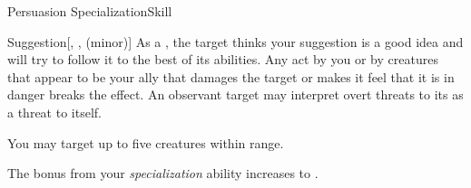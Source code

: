 \begin{feat}{Persuasion Specialization}{Skill}
\begin{freeability}{Suggestion}[, ,  (minor)]
            \hit As a , the target thinks your suggestion is a good idea and will try to follow it to the best of its abilities.
            Any act by you or by creatures that appear to be your ally that damages the target or makes it feel that it is in danger breaks the effect.
            An observant target may interpret overt threats to its  as a threat to itself.

            \rankline
             You may target up to five creatures within range.
        \end{freeability}

         The bonus from your \textit{specialization} ability increases to .

    \end{feat}

